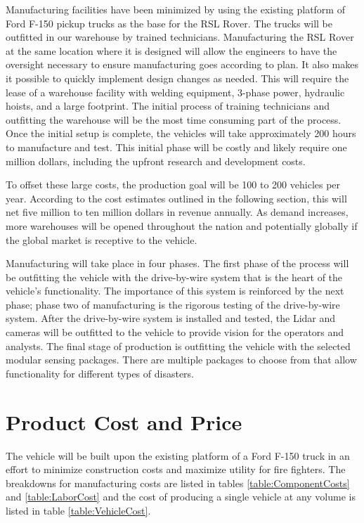 Manufacturing facilities have been minimized by using the existing platform of Ford F-150 pickup trucks as the base for the RSL Rover. The trucks will be outfitted in our warehouse by trained technicians. Manufacturing the RSL Rover at the same location where it is designed will allow the engineers to have the oversight necessary to ensure manufacturing goes according to plan. It also makes it possible to quickly implement design changes as needed. This will require the lease of a warehouse facility with welding equipment, 3-phase power, hydraulic hoists, and a large footprint. The initial process of training technicians and outfitting the warehouse will be the most time consuming part of the process. Once the initial setup is complete, the vehicles will take approximately 200 hours to manufacture and test. This initial phase will be costly and likely require one million dollars, including the upfront research and development costs.

To offset these large costs, the production goal will be 100 to 200 vehicles per year. According to the cost estimates outlined in the following section, this will net five million to ten million dollars in revenue annually. As demand increases, more warehouses will be opened throughout the nation and potentially globally if the global market is receptive to the vehicle.

Manufacturing will take place in four phases. The first phase of the process will be outfitting the vehicle with the drive-by-wire system that is the heart of the vehicle's functionality. The importance of this system is reinforced by the next phase; phase two of manufacturing is the rigorous testing of the drive-by-wire system. After the drive-by-wire system is installed and tested, the Lidar and cameras will be outfitted to the vehicle to provide vision for the operators and analysts. The final stage of production is outfitting the vehicle with the selected modular sensing packages. There are multiple packages to choose from that allow functionality for different types of disasters.

\section{Product Cost and Price}

The vehicle will be built upon the existing platform of a Ford F-150 truck in an effort to minimize construction costs and maximize utility for fire fighters. The breakdowns for manufacturing costs are listed in tables \ref{table:ComponentCosts} and \ref{table:LaborCost} and the cost of producing a single vehicle at any volume is listed in table \ref{table:VehicleCost}.


